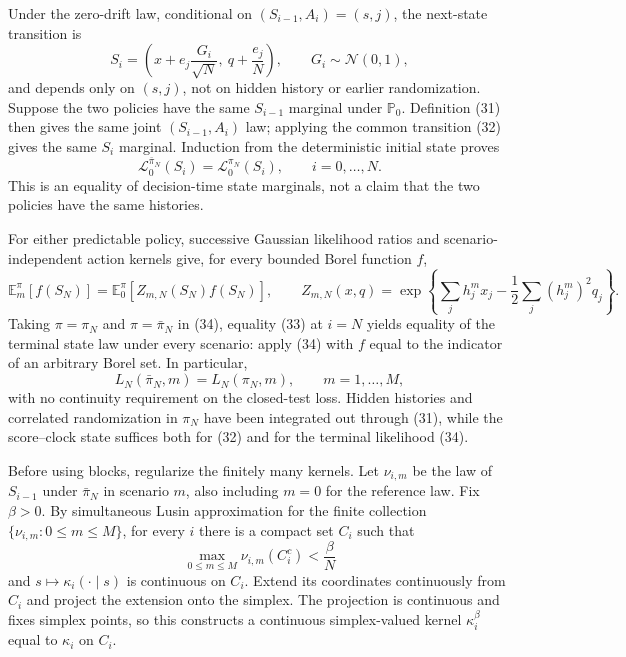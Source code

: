 Under the zero-drift law, conditional on \((S_{i-1},A_i)=(s,j)\), the next-state transition is
\[
 S_i=\left(x+e_j\frac{G_i}{\sqrt N},\ q+\frac{e_j}{N}\right),
 \qquad G_i\sim\mathcal N(0,1),                                 \tag{32}
\]
and depends only on \((s,j)\), not on hidden history or earlier randomization.  Suppose the two policies have the same \(S_{i-1}\) marginal under \(\mathbb P_0\).  Definition (31) then gives the same joint \((S_{i-1},A_i)\) law; applying the common transition (32) gives the same \(S_i\) marginal.  Induction from the deterministic initial state proves
\[
 \mathcal L_0^{\bar\pi_N}(S_i)=\mathcal L_0^{\pi_N}(S_i),
 \qquad i=0,\ldots,N.                                           \tag{33}
\]
This is an equality of decision-time state marginals, not a claim that the two policies have the same histories.

For either predictable policy, successive Gaussian likelihood ratios and scenario-independent action kernels give, for every bounded Borel function \(f\),
\[
 \mathbb E_m^{\pi}[f(S_N)]
 =\mathbb E_0^{\pi}[Z_{m,N}(S_N)f(S_N)],
 \qquad
 Z_{m,N}(x,q)=
 \exp\!\left\{\sum_jh_j^mx_j-\frac12\sum_j(h_j^m)^2q_j\right\}. \tag{34}
\]
Taking \(\pi=\pi_N\) and \(\pi=\bar\pi_N\) in (34), equality (33) at \(i=N\) yields equality of the terminal state law under every scenario: apply (34) with \(f\) equal to the indicator of an arbitrary Borel set.  In particular,
\[
 L_N(\bar\pi_N,m)=L_N(\pi_N,m),\qquad m=1,\ldots,M,              \tag{35}
\]
with no continuity requirement on the closed-test loss.  Hidden histories and correlated randomization in \(\pi_N\) have been integrated out through (31), while the score--clock state suffices both for (32) and for the terminal likelihood (34).

Before using blocks, regularize the finitely many kernels.  Let \(\nu_{i,m}\) be the law of \(S_{i-1}\) under \(\bar\pi_N\) in scenario \(m\), also including \(m=0\) for the reference law.  Fix \(\beta>0\).  By simultaneous Lusin approximation for the finite collection \(\{\nu_{i,m}:0\leq m\leq M\}\), for every \(i\) there is a compact set \(C_i\) such that
\[
 \max_{0\leq m\leq M}\nu_{i,m}(C_i^c)<\frac\beta N             \tag{36}
\]
and \(s\mapsto\kappa_i(\cdot\mid s)\) is continuous on \(C_i\).  Extend its coordinates continuously from \(C_i\) and project the extension onto the simplex.  The projection is continuous and fixes simplex points, so this constructs a continuous simplex-valued kernel \(\kappa_i^\beta\) equal to \(\kappa_i\) on \(C_i\).

